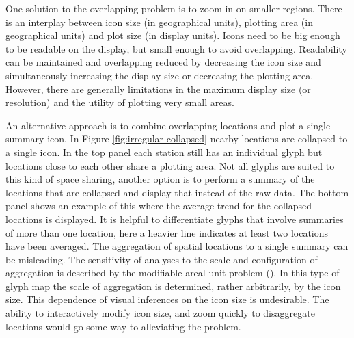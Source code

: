 \documentclass[oneside]{article}
\begin{document}
One solution to the overlapping problem is to zoom in on smaller regions. There is an interplay between icon size (in geographical units), plotting area (in geographical units) and plot size (in display units).  Icons need to be big enough to be readable on the display, but small enough to avoid overlapping.  Readability can be maintained and overlapping reduced by decreasing the icon size and simultaneously increasing the display size or decreasing the plotting area.
However, there are generally limitations in the maximum display size (or resolution) and the utility of plotting very small areas.  

An alternative approach is to combine overlapping locations and plot a single summary icon.  In Figure \ref{fig:irregular-collapsed} nearby locations are collapsed to a single icon.  In the top panel each station still has an individual glyph but locations close to each other share a plotting area.  Not all glyphs are suited to this kind of space sharing, another option is to perform a summary of the locations that are collapsed and display that instead of the raw data.  The bottom panel shows an example of this where the average trend for the collapsed locations is displayed.  It is helpful to differentiate glyphs that involve summaries of more than one location, here a heavier line indicates at least two locations have been averaged.  The aggregation of spatial locations to a single summary can be misleading.  The sensitivity of analyses to the scale and configuration of aggregation is described by the  modifiable areal unit problem (\cite{Openshaw:1984kx, Fotheringham:1991uq}). In this type of glyph map the scale of aggregation is determined, rather arbitrarily, by the icon size. This dependence of visual inferences on the icon size is undesirable.  The ability to interactively modify icon size, and zoom quickly to disaggregate locations would go some way to alleviating the problem.
\end{document}

